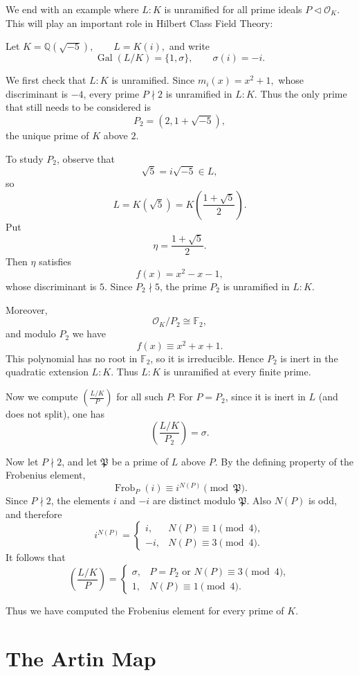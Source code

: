 We end with an example where $L:K$ is unramified for all prime ideals $P \lhd \mathcal O_K$. This will play an important role in Hilbert Class Field Theory:
\begin{example}\label{eg-FrobMinusFive}
Let $
K=\mathbb Q(\sqrt{-5}),\qquad L=K(i),
$
and write
$$
\operatorname{Gal}(L/K)=\{1,\sigma\},
\qquad \sigma(i)=-i.
$$

We first check that $L:K$ is unramified. Since $m_i(x) =
x^2+1,
$
whose discriminant is $-4$, every prime $P\nmid 2$ is unramified in
$L:K$. Thus the only prime that still needs to be considered is
$$
P_2=(2,1+\sqrt{-5}),
$$
the unique prime of $K$ above $2$.

To study $P_2$, observe that
$$
\sqrt5=i\sqrt{-5}\in L,
$$
so
$$
L=K(\sqrt5)
 =K\left(\frac{1+\sqrt5}{2}\right).
$$
Put
$$
\eta=\frac{1+\sqrt5}{2}.
$$
Then $\eta$ satisfies
$$
f(x)=x^2-x-1,
$$
whose discriminant is $5$. Since $P_2\nmid 5$, the prime $P_2$ is
unramified in $L:K$.

Moreover,
$$
\mathcal O_K/P_2\cong\mathbb F_2,
$$
and modulo $P_2$ we have
$$
f(x)\equiv x^2+x+1.
$$
This polynomial has no root in $\mathbb F_2$, so it is irreducible.
Hence $P_2$ is inert in the quadratic extension $L:K$. Thus $L:K$ is unramified at every finite prime.

Now we compute $\left(\frac{L/K}{P}\right)$ for all such $P$: For $P = P_2$, since it is inert in $L$ (and does not split), one has
$$
\left(\frac{L/K}{P_2}\right)=\sigma.
$$

Now let $P\nmid 2$, and let $\mathfrak P$ be a prime of $L$ above $P$.
By the defining property of the Frobenius element,
$$
\operatorname{Frob}_P(i)
\equiv i^{N(P)}
\pmod{\mathfrak P}.
$$
Since $P\nmid 2$, the elements $i$ and $-i$ are distinct modulo
$\mathfrak P$. Also $N(P)$ is odd, and therefore
$$
i^{N(P)}
=
\begin{cases}
i,&N(P)\equiv 1\pmod 4,\\
-i,&N(P)\equiv 3\pmod 4.
\end{cases}
$$
It follows that
$$
\boxed{
\left(\frac{L/K}{P}\right)=
\begin{cases}
\sigma,&P=P_2\text{ or }N(P)\equiv3\pmod4,\\[2mm]
1,&N(P)\equiv1\pmod4.
\end{cases}}
$$

Thus we have computed the Frobenius element for every prime of $K$.
\end{example}

\section{The Artin Map}

